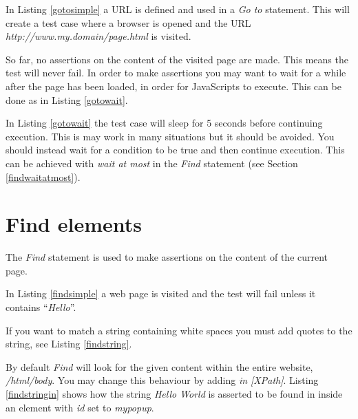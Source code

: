 \documentclass[a4paper,11pt]{kth-mag}
\begin{document}
In Listing \ref{gotosimple} a URL is defined and used in a \textit{Go to} statement. This will create a test case where a browser is opened and the URL \textit{http://www.my.domain/page.html} is visited.


So far, no assertions on the content of the visited page are made. This means the test will never fail. In order to make assertions you may want to wait for a while after the page has been loaded, in order for JavaScripts to execute. This can be done as in Listing \ref{gotowait}.

\lstset{basicstyle=\footnotesize, caption=Go to statement with wait, label=gotowait, numbers=left, frame=single, captionpos=b}


In Listing \ref{gotowait} the test case will sleep for 5 seconds before continuing execution. This is may work in many situations but it should be avoided. You should instead wait for a condition to be true and then continue execution. This can be achieved with \textit{wait at most} in the \textit{Find} statement (see Section \ref{findwaitatmost}).


\section{Find elements}
The \textit{Find} statement is used to make assertions on the content of the current page.

\lstset{basicstyle=\footnotesize, caption=Find statement, label=findsimple, numbers=left, frame=single, captionpos=b}


In Listing \ref{findsimple} a web page is visited and the test will fail unless it contains ``\textit{Hello}''.

If you want to match a string containing white spaces you must add quotes to the string, see Listing \ref{findstring}.

\lstset{basicstyle=\footnotesize, caption=Find statement with spaces, label=findstring, numbers=left, frame=single, captionpos=b}


By default \textit{Find} will look for the given content within the entire website, \textit{/html/body}. You may change this behaviour by adding \textit{in [XPath]}. Listing \ref{findstringin} shows how the string \textit{Hello World} is asserted to be found in inside an element with \textit{id} set to \textit{mypopup}. 
\end{document}
